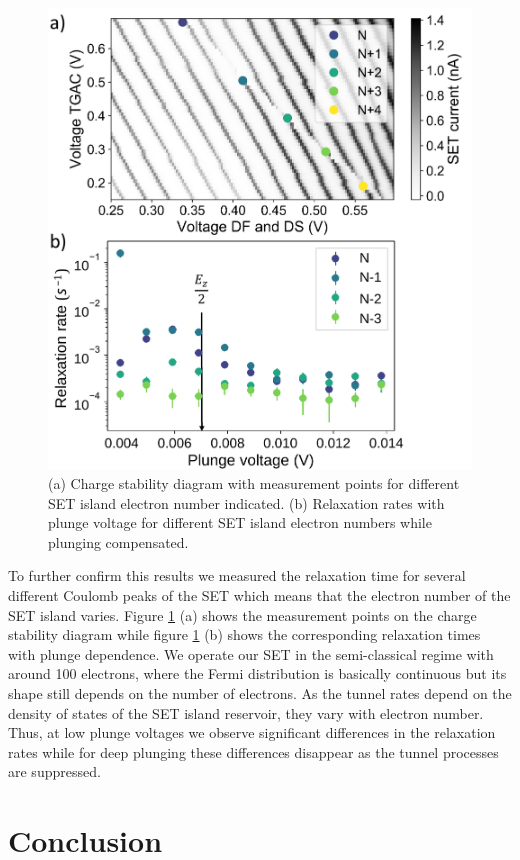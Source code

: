 \begin{figure}
\centering
\includegraphics[width=0.8\columnwidth]{figures/fig6.pdf}
\caption{
(a) Charge stability diagram with measurement points for different SET island electron number indicated. (b) Relaxation rates with plunge voltage for different SET island electron numbers while plunging compensated. 
}
\label{fig:electronnumberdependence}
\end{figure}

To further confirm this results we measured the relaxation time for several different Coulomb peaks of the SET which means that the electron number of the SET island varies.
Figure \ref{fig:electronnumberdependence} (a) shows the measurement points on the charge stability diagram while figure \ref{fig:electronnumberdependence} (b) shows the corresponding relaxation times with plunge dependence. We operate our SET in the semi-classical regime with around 100 electrons, where the Fermi distribution is basically continuous but its shape still depends on the number of electrons. As the tunnel rates depend on the density of states of the SET island reservoir, they vary with electron number. Thus, at low plunge voltages we observe significant differences in the relaxation rates while for deep plunging these differences disappear as the tunnel processes are suppressed. 


\section{\label{sec:conclusion}Conclusion}

